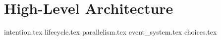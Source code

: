 \section{High-Level Architecture}
{intention.tex}
{lifecycle.tex}
{parallelism.tex}
{event_system.tex}
{choices.tex}
